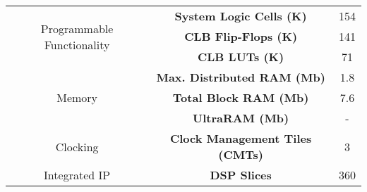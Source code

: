 \begin{tabular}{|c|c|c|}
\hline
\multirow{3}{*}{Programmable Functionality} &
    \textbf{System Logic Cells (K)} & 154 \\
    \arrayrulecolor{gray!40}\cline{2-3}\arrayrulecolor{black} &
    \textbf{CLB Flip-Flops (K)}     & 141 \\
    \arrayrulecolor{gray!40}\cline{2-3}\arrayrulecolor{black} &
    \textbf{CLB LUTs (K)}                  & 71 \\
\hline
\multirow{3}{*}{Memory} &
    \textbf{Max. Distributed RAM (Mb)}     & 1.8 \\
    \arrayrulecolor{gray!40}\cline{2-3}\arrayrulecolor{black} &
    \textbf{Total Block RAM (Mb)}          & 7.6 \\
    \arrayrulecolor{gray!40}\cline{2-3}\arrayrulecolor{black} &
    \textbf{UltraRAM (Mb)}                 & - \\
\hline
\multirow{1}{*}{Clocking} &
    \textbf{Clock Management Tiles (CMTs)} & 3 \\
\hline
\multirow{1}{*}{Integrated IP} &
    \textbf{DSP Slices}                   & 360 \\
\hline
\end{tabular}
